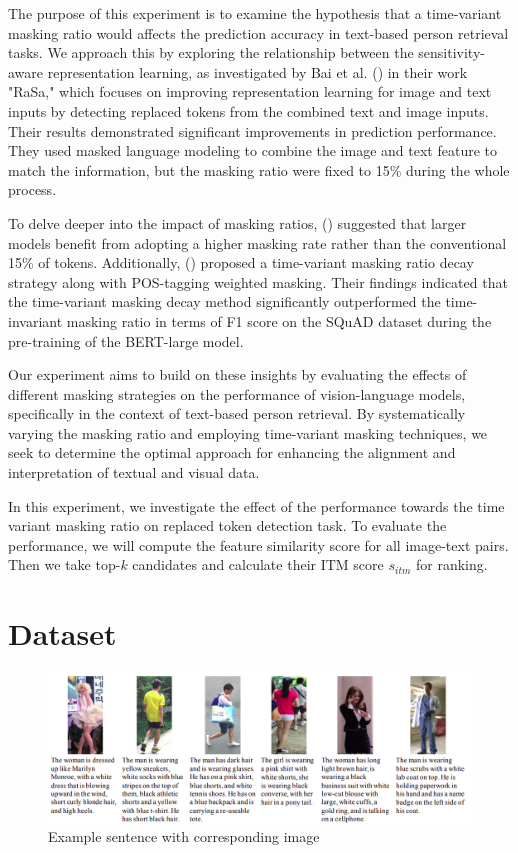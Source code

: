 The purpose of this experiment is to examine the hypothesis that a time-variant masking ratio would affects the prediction accuracy in text-based person retrieval tasks. We approach this by exploring the relationship between the sensitivity-aware representation learning, as investigated by Bai et al. (\cite{Bai2023RaSaRA}) in their work "RaSa," which focuses on improving representation learning for image and text inputs by detecting replaced tokens from the combined text and image inputs. Their results demonstrated significant improvements in prediction performance. They used masked language modeling to combine the image and text feature to match the information, but the masking ratio were fixed to 15\% during the whole process.

To delve deeper into the impact of masking ratios, (\cite{wettig-etal-2023-mask}) suggested that larger models benefit from adopting a higher masking rate rather than the  conventional 15\% of tokens. Additionally, (\cite{yang2023learningbettermaskingbetter}) proposed a time-variant masking ratio decay strategy along with POS-tagging weighted masking. Their findings indicated that the time-variant masking decay method significantly outperformed the time-invariant masking ratio in terms of F1 score on the SQuAD dataset during the pre-training of the BERT-large model.

Our experiment aims to build on these insights by evaluating the effects of different masking strategies on the performance of vision-language models, specifically in the context of text-based person retrieval. By systematically varying the masking ratio and employing time-variant masking techniques, we seek to determine the optimal approach for enhancing the alignment and interpretation of textual and visual data.

In this experiment, we investigate the effect of the performance towards the time variant masking ratio on replaced token detection task. To evaluate the performance, we will compute the feature similarity score for all image-text pairs. Then we take top-$k$ candidates and calculate their ITM score $s_{itm}$ for ranking. 

\section{Dataset}

\begin{figure}[htbp]
  \begin{center}
      \includegraphics[width=\linewidth]{img/cuhk_pedes.png}
      \caption{Example sentence with corresponding image}
      \label{fig:cuhk_pedes}
  \end{center}
\end{figure}


